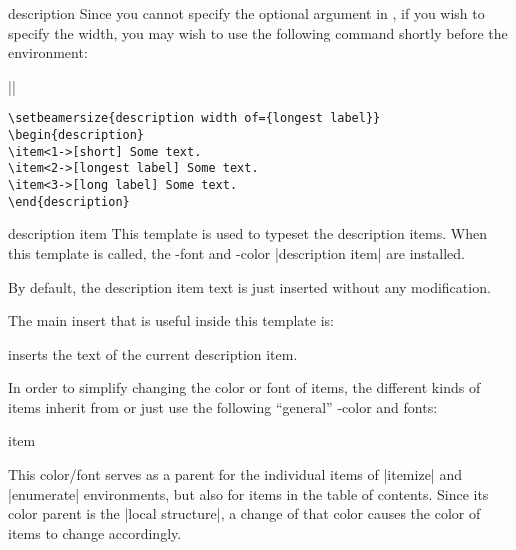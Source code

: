 \begin{environment}{{description}}
  \lyxnote
  Since you cannot specify the optional argument in \LyX, if you wish
  to specify the width, you may wish to use the following command
  shortly before the environment:

  ||

  \example
\begin{verbatim}
\setbeamersize{description width of={longest label}}
\begin{description}
\item<1->[short] Some text.
\item<2->[longest label] Some text.
\item<3->[long label] Some text.
\end{description}
\end{verbatim}

  \begin{element}{description item}\yes\yes\yes
    This template is used to typeset the description items. When this
    template is called, the \beamer-font and -color |description item|
    are installed.

    \begin{templateoptions}
      By default, the description item text is just inserted without
      any modification.
    \end{templateoptions}

    The main insert that is useful inside this template is:
    \begin{templateinserts}
      \iteminsert{\insertdescriptionitem} inserts the text of the
      current description item.
    \end{templateinserts}
  \end{element}
\end{environment}



In order to simplify changing the color or font of items, the
different kinds of items inherit from or just use the following
``general'' \beamer-color and fonts:

\begin{element}{item}\no\yes\yes

  This color/font serves as a parent for the individual items of
  |itemize| and |enumerate| environments, but also for items in the
  table of contents. Since its color parent is the |local structure|,
  a change of that color causes the color of items to change
  accordingly.
\end{element}

